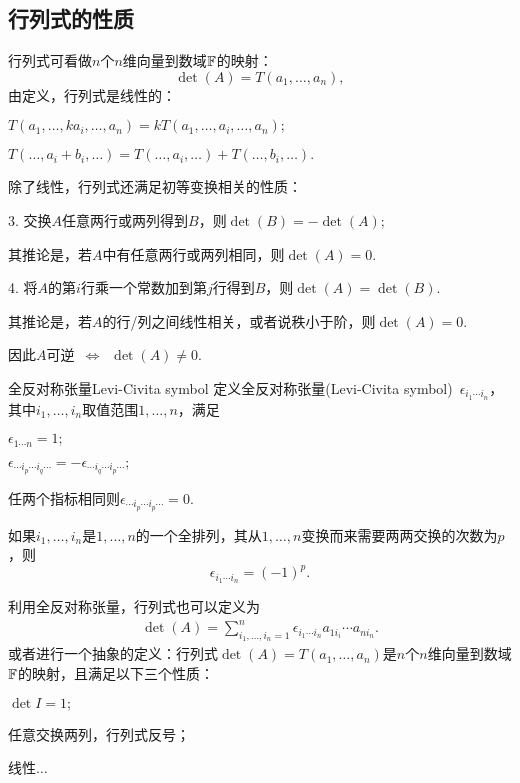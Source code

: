 \subsection{行列式的性质}
行列式可看做$n$个$n$维向量到数域$\mathbb F$的映射：
\[
	\det (A)=T(a_1,\ldots,a_n),
\]
由定义，行列式是线性的：
\begin{compactenum}
	\item $T(a_1,\ldots,ka_i,\ldots,a_n)=kT(a_1,\ldots,a_i,\ldots,a_n);$
	\item $T(\ldots,a_i+b_i,\ldots)=T(\ldots,a_i,\ldots)+T(\ldots,b_i,\ldots).$
\end{compactenum}
除了线性，行列式还满足初等变换相关的性质：
\begin{compactenum}
	\item[3.] 交换$A$任意两行或两列得到$B$，则$\det(B)=-\det(A);$
	
	其推论是，若$A$中有任意两行或两列相同，则$\det(A)=0.$
	\item[4.] 将$A$的第$i$行乘一个常数加到第$j$行得到$B$，则$\det(A)=\det(B).$
	
	其推论是，若$A$的行/列之间线性相关，或者说秩小于阶，则$\det (A)=0.$
\end{compactenum}
因此$A$可逆$\enspace\Leftrightarrow\enspace\det(A)\neq 0.$
\begin{definition}{全反对称张量}{Levi-Civita symbol}
	定义全反对称张量(Levi-Civita symbol)~$\epsilon_{i_1\cdots i_n}$，其中$i_1,\ldots,i_n$取值范围$1,\ldots,n$，满足
	\begin{compactitem}
		\item $\epsilon_{1\cdots n}=1;$
		\item $\epsilon_{\cdots i_p\cdots i_q\cdots}=-\epsilon_{\cdots i_q\cdots i_p\cdots};$
		\item 任两个指标相同则$\epsilon_{\cdots i_p\cdots i_p\cdots}=0.$
	\end{compactitem}
	如果$i_1,\ldots,i_n$是$1,\ldots,n$的一个全排列，其从$1,\ldots,n$变换而来需要两两交换的次数为$p$，则 
	\[
		\epsilon_{i_1\cdots i_n}=(-1)^p.
	\]
\end{definition}
利用全反对称张量，行列式也可以定义为
\begin{align}
	\det(A)=\sum_{i_1,\ldots,i_n=1}^n\epsilon_{i_1\cdots i_n}a_{1i_i}\cdots a_{ni_n}.
\end{align}
或者进行一个抽象的定义：行列式$\det(A)=T(a_1,\ldots,a_n)$是$n$个$n$维向量到数域$\mathbb F$的映射，且满足以下三个性质：
\begin{compactenum}
	\item $\det I=1;$
	\item 任意交换两列，行列式反号；
	\item 线性$\ldots$
\end{compactenum}
